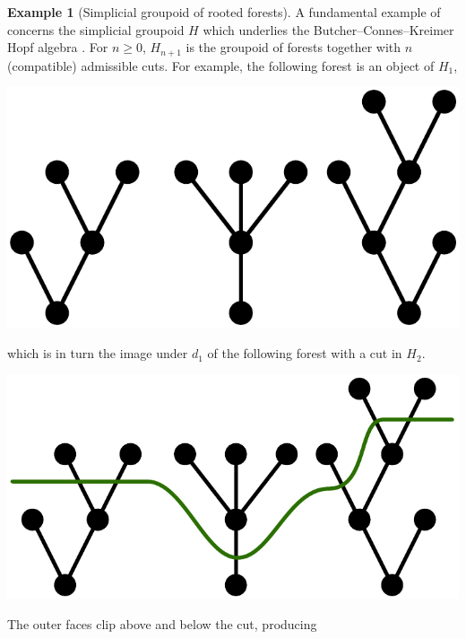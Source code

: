 \documentclass{amsart}
\theoremstyle{definition}
\newtheorem{example}[theorem]{Example}
\theoremstyle{remark}
\begin{document}
\begin{example}[Simplicial groupoid of rooted forests]\label{ex forests}
A fundamental example of \cite{GKT1} concerns the simplicial groupoid $H$ which underlies the Butcher--Connes--Kreimer Hopf algebra \cite{ConnesKreimer:HARNG}.
For $n \geq 0$, $H_{n+1}$ is the groupoid of forests together with $n$ (compatible) admissible cuts.
For example, the following forest is an object of $H_1$,
\begin{center}
\includegraphics[scale=0.2]{forest_no_cut.pdf}
\end{center}
which is in turn the image under $d_1$ of the following forest with a cut in $H_2$.
\begin{center}
\includegraphics[scale=0.2]{forest_with_cut.pdf}
\end{center}
The outer faces clip above and below the cut, producing 
\begin{center}

\end{center}
\end{example}
\end{document}

